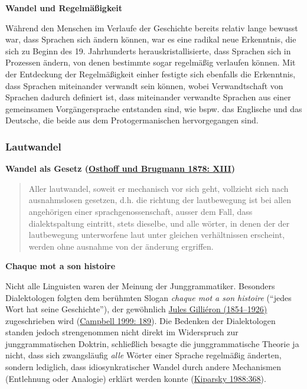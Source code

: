 \par\noindent\textbf{Wandel und Regelmäßigkeit}

Während den Menschen im Verlaufe der Geschichte bereits relativ lange
bewusst war, dass Sprachen sich ändern können, war es eine radikal neue
Erkenntnis, die sich zu Beginn des 19. Jahrhunderts
herauskristallisierte, dass Sprachen sich in Prozessen ändern, von denen
bestimmte sogar regelmäßig verlaufen können. Mit der Entdeckung der
Regelmäßigkeit einher festigte sich ebenfalls die Erkenntnis, dass
Sprachen miteinander verwandt sein können, wobei Verwandtschaft von
Sprachen dadurch definiert ist, dass miteinander verwandte Sprachen aus
einer gemeinsamen Vorgängersprache entstanden sind, wie bspw. das
Englische und das Deutsche, die beide aus dem Protogermanischen
hervorgegangen sind.


\subsubsection{\texorpdfstring{{Lautwandel}}{Lautwandel}}

\par\noindent\textbf{Wandel als Gesetz
(\href{http://bibliography.lingpy.org?key=Osthoff1878}{Osthoff und
Brugmann 1878: XIII})}

\begin{quote}
Aller lautwandel, soweit er mechanisch vor sich geht, vollzieht sich
nach ausnahmslosen gesetzen, d.h. die richtung der lautbewegung ist bei
allen angehörigen einer sprachgenossenschaft, ausser dem Fall, dass
dialektspaltung eintritt, stets dieselbe, und alle wörter, in denen der
der lautbewegung unterworfene laut unter gleichen verhältnissen
erscheint, werden ohne ausnahme von der änderung ergriffen.
\end{quote}



\par\noindent\textbf{Chaque mot a son histoire}

Nicht alle Linguisten waren der Meinung der Junggrammatiker. Besonders
Dialektologen folgten dem berühmten Slogan \emph{chaque mot a son
histoire} (``jedes Wort hat seine Geschichte''), der gewöhnlich
\href{http://de.wikipedia.org/wiki/Jules_Gilliéron}{Jules Gilliéron
(1854--1926)} zugeschrieben wird
(\href{http://bibliography.lingpy.org?key=Campbell1999}{Campbell 1999:
189}). Die Bedenken der Dialektologen standen jedoch strengenommen nicht
direkt im Widerspruch zur junggrammatischen Doktrin, schließlich besagte
die junggrammatische Theorie ja nicht, dass sich zwangsläufig
\emph{alle} Wörter einer Sprache regelmäßig änderten, sondern lediglich,
dass idiosynkratischer Wandel durch andere Mechanismen (Entlehnung oder
Analogie) erklärt werden konnte
(\href{http://bibliography.lingpy.org?key=Kiparsky1988}{Kiparsky
1988:368}).

